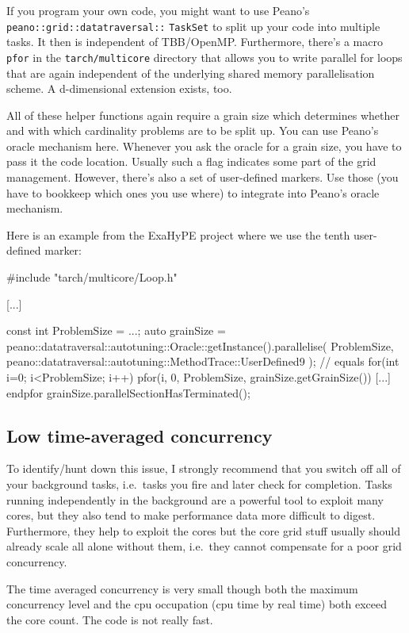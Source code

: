 \noindent
If you program your own code, you might want to use Peano's
\texttt{peano::grid::datatraversal::} \texttt{TaskSet} to split up your code
into multiple tasks. It then is independent of TBB/OpenMP. Furthermore, there's a macro
\texttt{pfor} in the \texttt{tarch/multicore} directory that allows you to write
parallel for loops that are again independent of the underlying shared memory
parallelisation scheme. A d-dimensional extension exists, too.

All of these helper functions again require a grain size which determines
whether and with which cardinality problems are to be split up.
You can use Peano's oracle mechanism here.
Whenever you ask the oracle for a grain size, you have to pass it the code
location.
Usually such a flag indicates some part of the grid management.
However, there's also a set of user-defined markers.
Use those (you have to bookkeep which ones you use where) to integrate into
Peano's oracle mechanism.

 
Here is an example from the ExaHyPE project where we use the tenth user-defined
marker:
\begin{code}
#include "tarch/multicore/Loop.h"

[...]

const int ProblemSize = ...;
auto grainSize = peano::datatraversal::autotuning::Oracle::getInstance().parallelise(
 ProblemSize,
 peano::datatraversal::autotuning::MethodTrace::UserDefined9
); 
// equals for(int i=0; i<ProblemSize; i++)
pfor(i, 0, ProblemSize, grainSize.getGrainSize())
  [...]
endpfor
grainSize.parallelSectionHasTerminated();
\end{code}



\subsection{Low time-averaged concurrency}

To identify/hunt down this issue, I strongly recommend that you switch off all
of your background tasks, i.e.~tasks you fire and later check for completion.
Tasks running independently in the background are a powerful tool to exploit
many cores, but they also tend to make performance data more difficult to
digest.
Furthermore, they help to exploit the cores but the core grid stuff usually
should already scale all alone without them, i.e.~they cannot compensate for a
poor grid concurrency.


\begin{smell}
  The time averaged concurrency is very small though both the maximum
  concurrency level and the cpu occupation (cpu time by real time) both exceed
  the core count. The code is not really fast.
\end{smell}


